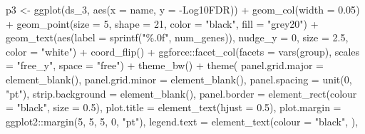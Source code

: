 \documentclass[
  11pt,
  oneside]{book}
\newenvironment{Shaded}{\begin{snugshade}}{\end{snugshade}}
\newcommand{\AttributeTok}[1]{\textcolor[rgb]{0.77,0.63,0.00}{#1}}
\newcommand{\DecValTok}[1]{\textcolor[rgb]{0.00,0.00,0.81}{#1}}
\newcommand{\FloatTok}[1]{\textcolor[rgb]{0.00,0.00,0.81}{#1}}
\newcommand{\FunctionTok}[1]{\textcolor[rgb]{0.00,0.00,0.00}{#1}}
\newcommand{\NormalTok}[1]{#1}
\newcommand{\OtherTok}[1]{\textcolor[rgb]{0.56,0.35,0.01}{#1}}
\newcommand{\SpecialCharTok}[1]{\textcolor[rgb]{0.00,0.00,0.00}{#1}}
\newcommand{\StringTok}[1]{\textcolor[rgb]{0.31,0.60,0.02}{#1}}
\begin{document}
\begin{Shaded}
\begin{Highlighting}[]
\NormalTok{p3 }\OtherTok{\textless{}{-}} \FunctionTok{ggplot}\NormalTok{(ds\_3, }\FunctionTok{aes}\NormalTok{(}\AttributeTok{x =}\NormalTok{ name, }\AttributeTok{y =} \StringTok{\textasciigrave{}}\AttributeTok{{-}Log10FDR}\StringTok{\textasciigrave{}}\NormalTok{)) }\SpecialCharTok{+}
  \FunctionTok{geom\_col}\NormalTok{(}\AttributeTok{width =} \FloatTok{0.05}\NormalTok{) }\SpecialCharTok{+}
  \FunctionTok{geom\_point}\NormalTok{(}\AttributeTok{size =} \DecValTok{5}\NormalTok{, }\AttributeTok{shape =} \DecValTok{21}\NormalTok{, }\AttributeTok{color =} \StringTok{"black"}\NormalTok{, }\AttributeTok{fill =} \StringTok{"grey20"}\NormalTok{) }\SpecialCharTok{+}
  \FunctionTok{geom\_text}\NormalTok{(}\FunctionTok{aes}\NormalTok{(}\AttributeTok{label =} \FunctionTok{sprintf}\NormalTok{(}\StringTok{"\%.0f"}\NormalTok{, num\_genes)), }\AttributeTok{nudge\_y =} \DecValTok{0}\NormalTok{, }\AttributeTok{size =} \FloatTok{2.5}\NormalTok{, }\AttributeTok{color =} \StringTok{"white"}\NormalTok{) }\SpecialCharTok{+}
  \FunctionTok{coord\_flip}\NormalTok{() }\SpecialCharTok{+}
\NormalTok{  ggforce}\SpecialCharTok{::}\FunctionTok{facet\_col}\NormalTok{(}\AttributeTok{facets =} \FunctionTok{vars}\NormalTok{(group), }\AttributeTok{scales =} \StringTok{"free\_y"}\NormalTok{, }\AttributeTok{space =} \StringTok{"free"}\NormalTok{) }\SpecialCharTok{+}
  \FunctionTok{theme\_bw}\NormalTok{() }\SpecialCharTok{+}
  \FunctionTok{theme}\NormalTok{(}
    \AttributeTok{panel.grid.major =} \FunctionTok{element\_blank}\NormalTok{(),}
    \AttributeTok{panel.grid.minor =} \FunctionTok{element\_blank}\NormalTok{(),}
    \AttributeTok{panel.spacing =} \FunctionTok{unit}\NormalTok{(}\DecValTok{0}\NormalTok{, }\StringTok{"pt"}\NormalTok{),}
    \AttributeTok{strip.background =} \FunctionTok{element\_blank}\NormalTok{(),}
    \AttributeTok{panel.border =} \FunctionTok{element\_rect}\NormalTok{(}\AttributeTok{colour =} \StringTok{"black"}\NormalTok{, }\AttributeTok{size =} \FloatTok{0.5}\NormalTok{),}
    \AttributeTok{plot.title =} \FunctionTok{element\_text}\NormalTok{(}\AttributeTok{hjust =} \FloatTok{0.5}\NormalTok{),}
    \AttributeTok{plot.margin =}\NormalTok{ ggplot2}\SpecialCharTok{::}\FunctionTok{margin}\NormalTok{(}\DecValTok{5}\NormalTok{, }\DecValTok{5}\NormalTok{, }\DecValTok{5}\NormalTok{, }\DecValTok{0}\NormalTok{, }\StringTok{"pt"}\NormalTok{),}
    \AttributeTok{legend.text =} \FunctionTok{element\_text}\NormalTok{(}\AttributeTok{colour =} \StringTok{"black"}\NormalTok{, ),}

\end{Highlighting}
\end{Shaded}
\end{document}
